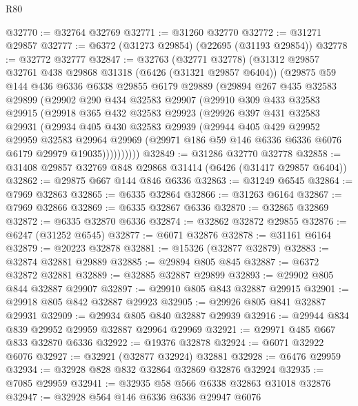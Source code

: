\begin{lexlean}{R80}
\begin{coremodule}
@32770 := @32764 @32769
@32771 := @31260 @32770
@32772 := @31271 @29857
@32777 := @6372 (@31273 @29854) (@22695 (@31193 @29854))
@32778 := @32772 @32777
@32847 := @32763
    (@32771 @32778)
    (@31312
      @29857
      @32761
      @438
      @29868
      @31318
      (@6426 (@31321 @29857 @6404))
      (@29875
        @59
        @144
        @436
        @6336
        @6338
        @29855
        @6179
        @29889
        (@29894
          @267
          @435
          @32583
          @29899
          (@29902
            @290
            @434
            @32583
            @29907
            (@29910
              @309
              @433
              @32583
              @29915
              (@29918
                @365
                @432
                @32583
                @29923
                (@29926
                  @397
                  @431
                  @32583
                  @29931
                  (@29934
                    @405
                    @430
                    @32583
                    @29939
                    (@29944
                      @405
                      @429
                      @29952
                      @29959
                      @32583
                      @29964
                      @29969
                      (@29971 @186 @59 @146 @6336 @6336 @6076 @6179 @29979 @19035))))))))))
@32849 := @31286 @32770 @32778
@32858 := @31408 @29857 @32769 @848 @29868 @31414 (@6426 (@31417 @29857 @6404))
@32862 := @29875 @667 @144 @846 @6336
@32863 := @31249 @6545
@32864 := @7969 @32863
@32865 := @6335 @32864
@32866 := @31263 @6164
@32867 := @7969 @32866
@32869 := @6335 @32867 @6336
@32870 := @32865 @32869
@32872 := @6335 @32870 @6336
@32874 := @32862 @32872 @29855
@32876 := @6247 (@31252 @6545)
@32877 := @6071 @32876
@32878 := @31161 @6164
@32879 := @20223 @32878
@32881 := @15326 (@32877 @32879)
@32883 := @32874 @32881 @29889
@32885 := @29894 @805 @845
@32887 := @6372 @32872 @32881
@32889 := @32885 @32887 @29899
@32893 := @29902 @805 @844 @32887 @29907
@32897 := @29910 @805 @843 @32887 @29915
@32901 := @29918 @805 @842 @32887 @29923
@32905 := @29926 @805 @841 @32887 @29931
@32909 := @29934 @805 @840 @32887 @29939
@32916 := @29944 @834 @839 @29952 @29959 @32887 @29964 @29969
@32921 := @29971 @485 @667 @833 @32870 @6336
@32922 := @19376 @32878
@32924 := @6071 @32922 @6076
@32927 := @32921 (@32877 @32924) @32881
@32928 := @6476 @29959
@32934 := @32928 @828 @832 @32864 @32869 @32876 @32924
@32935 := @7085 @29959
@32941 := @32935 @58 @566 @6338 @32863 @31018 @32876
@32947 := @32928 @564 @146 @6336 @6336 @29947 @6076

\end{coremodule}
\end{lexlean}

